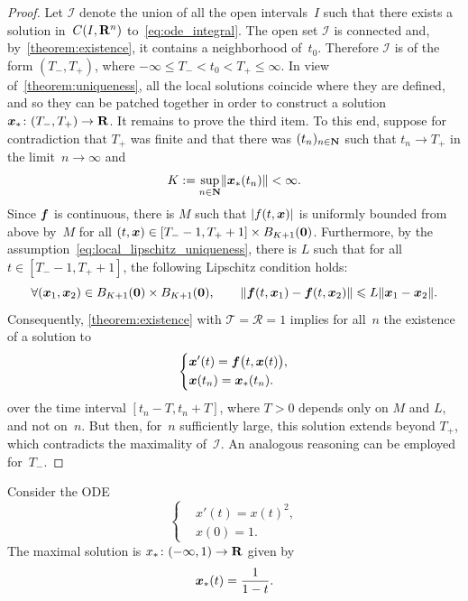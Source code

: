 \begin{proof}
    Let $\mathcal I$ denote the union of all the open intervals~$I$ such that there exists a solution in~$C(I, \mathbf R^n)$ to~\eqref{eq:ode_integral}.
    The open set $\mathcal I$ is connected and, by~\cref{theorem:existence},
    it contains a neighborhood of~$t_0$.
    Therefore $\mathcal I$ is of the form $(T_-, T_+)$,
    where $-\infty \leq T_- <  t_0 < T_+ \leq \infty$.
    In view of~\cref{theorem:uniqueness},
    all the local solutions coincide where they are defined,
    and so they can be patched together in order to construct a solution~$\mathbf{\boldsymbol{x}}_*\colon (T_-, T_+) \to \mathbf R$.
    It remains to prove the third item.
    To this end, suppose for contradiction that $T_+$ was finite and that
    there was $(t_n)_{n \in \mathbf N}$ such that $t_n \to T_+$ in the limit~$n \to \infty$ and~
    \[
        K := \sup_{n \in \mathbf N} \lVert\mathbf{\boldsymbol{x}}_*(t_n)\rVert < \infty.
    \]
    Since $\mathbf{\boldsymbol{f}}$ is continuous,
    there is $M$ such that $\lvert f(t, \mathbf{\boldsymbol{x}}) \rvert$ is uniformly bounded from above by~$M$ for all $(t, \mathbf{\boldsymbol{x}}) \in [T_- - 1, T_+ + 1] \times B_{K+1}(\mathbf{\boldsymbol{0}})$.
    Furthermore, by the assumption~\eqref{eq:local_lipschitz_uniqueness},
    there is $L$ such that for all $t \in [T_- - 1, T_+ + 1]$,
    the following Lipschitz condition holds:
    \[
        \forall (\mathbf{\boldsymbol{x}}_1, \mathbf{\boldsymbol{x}}_2) \in  B_{K+1}(\mathbf{\boldsymbol{0}}) \times B_{K+1}(\mathbf{\boldsymbol{0}}), \qquad
        \lVert \mathbf{\boldsymbol{f}}(t, \mathbf{\boldsymbol{x}}_1) - \mathbf{\boldsymbol{f}}(t, \mathbf{\boldsymbol{x}}_2) \rVert \leqslant L \lVert\mathbf{\boldsymbol{x}}_1 - \mathbf{\boldsymbol{x}}_2\rVert.
    \]
    Consequently, \cref{theorem:existence} with $\mathcal T = \mathcal R = 1$ implies for all~$n$ the existence of a solution to
    \[
        \left \{
        \begin{aligned}
            & \mathbf{\boldsymbol{x}}'(t) = \mathbf{\boldsymbol{f}}\bigl(t, \mathbf{\boldsymbol{x}}(t)\bigr), \\
            & \mathbf{\boldsymbol{x}}(t_n) = \mathbf{\boldsymbol{x}}_*(t_n).
        \end{aligned}
        \right.
    \]
    over the time interval $[t_n - T, t_n + T]$, where $T > 0$ depends only on $M$ and $L$, and not on~$n$.
    But then, for~$n$ sufficiently large,
    this solution extends beyond $T_+$,
    which contradicts the maximality of~$\mathcal I$.
    An analogous reasoning can be employed for~$T_-$.
\end{proof}
\begin{example}
    Consider the ODE
    \[
        \left \{
        \begin{aligned}
            & x'(t) = x(t)^2, \\
            & x(0) = 1.
        \end{aligned}
        \right.
    \]
    The maximal solution is $x_* \colon (-\infty, 1) \to \mathbf R$ given by
    \[
        \mathbf{\boldsymbol{x}}_*(t) = \frac{1}{1-t}.
    \]
\end{example}

